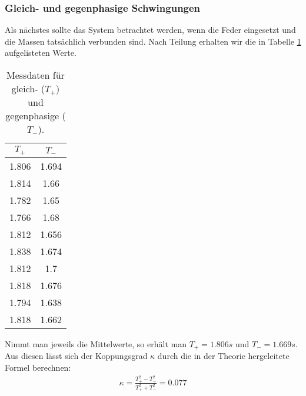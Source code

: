 \subsubsection{Gleich- und gegenphasige Schwingungen}
Als nächstes sollte das System betrachtet werden, wenn die Feder eingesetzt und die Massen tatsächlich verbunden sind.
Nach Teilung erhalten wir die in Tabelle \ref{tab:g1} aufgelisteten Werte. 
\begin{table}
    \centering
    \caption{Messdaten für gleich- ($T_{+}$) und gegenphasige ($T_{-}$).}
    \label{tab:g1}
    \begin{tabular}{c c}
     \toprule
     $T_{+}$ & $T_{-}$\\
     \midrule
     1.806 & 1.694 \\
     1.814 & 1.66 \\
     1.782 & 1.65 \\
     1.766 & 1.68 \\
     1.812 & 1.656 \\
     1.838 & 1.674 \\
     1.812 & 1.7\\
     1.818 & 1.676\\
     1.794 & 1.638 \\
     1.818 & 1.662 \\
     \bottomrule
    \end{tabular}
\end{table}
Nimmt man jeweils die Mittelwerte, so erhält man $T_{+} = 1.806s$ und $T_{-} = 1.669s$. Aus diesen lässt sich der Koppungsgrad $\kappa$ durch die in der 
Theorie hergeleitete Formel berechnen:
\begin{align}
\kappa = \frac{T_{+}^2 - T_{-}^2}{T_{+}^2 + T_{-}^2}
    = 0.077
\end{align}

